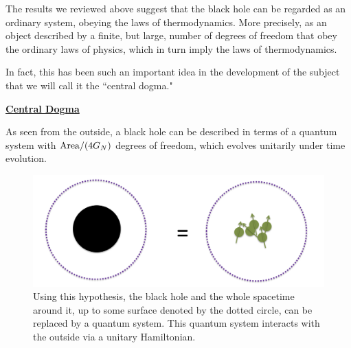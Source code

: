 
The results  we reviewed above suggest that the black hole can be regarded as an ordinary system, obeying the laws of thermodynamics. More precisely, as an object 
  described by a finite, but large, number of degrees of freedom that obey the ordinary laws of physics, which in turn imply the laws of thermodynamics. 
   

In fact, this has been such an important idea in the development of the subject that we will call it the ``central dogma."   \begin{center}
{ \color{red} \underline{\bf%
 Central Dogma}}
\end{center}

 
{\center \begin{framed}   As seen from the outside, a black hole can be described in terms of a quantum system with  $  {\rm Area}/(4G_N ) $  degrees of freedom,   which evolves unitarily under time evolution. 
\end{framed}}
  

\begin{figure}[h]
\begin{center}
\includegraphics[scale=.3]{figures/BHQuantumBdy.png}
\caption*{Using this hypothesis, the black hole and the whole spacetime around it, up to some surface denoted by the dotted circle, can be replaced by a quantum system. This quantum system interacts with the outside via a unitary Hamiltonian. }
\label{BHQuantumBdy}
\end{center}
\end{figure}

 

